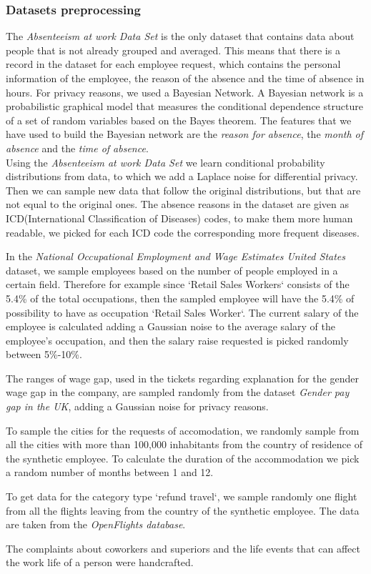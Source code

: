 \subsubsection{Datasets preprocessing}
The \textit{Absenteeism at work Data Set} is the only dataset that contains data about people that is not already grouped and averaged. This means that there is a record in the dataset for each employee request, which contains the personal information of the employee, the reason of the absence and the time of absence in hours. For privacy reasons, we used a Bayesian Network. A Bayesian network is a probabilistic graphical model that measures the conditional dependence structure of a set of random variables based on the Bayes theorem. The features that we have used to build the Bayesian network are the \textit{reason for absence}, the \textit{month of absence} and the \textit{time of absence}.
\\
Using the \textit{Absenteeism at work Data Set} we learn conditional probability distributions from data, to which we add a Laplace noise for differential privacy. Then we can sample new data that follow the original distributions, but that are not equal to the original ones. The absence reasons in the dataset are given as ICD(International Classification of Diseases) codes, to make them more human readable, we picked for each ICD code the corresponding more frequent diseases.

In the \textit{National Occupational Employment and Wage Estimates United States} dataset, we sample employees based on the number of people employed in a certain field. Therefore for example since `Retail Sales Workers` consists of the 5.4\% of the total occupations, then the sampled employee will have the 5.4\% of possibility to have as occupation `Retail Sales Worker`.
The current salary of the employee is calculated adding a Gaussian noise to the average salary of the employee's occupation, and then the salary raise requested is picked randomly between 5\%-10\%.

The ranges of wage gap, used in the tickets regarding explanation for the gender wage gap in the company, are sampled randomly from the dataset \textit{Gender pay gap in the UK}, adding a Gaussian noise for privacy reasons.

To sample the cities for the requests of accomodation, we randomly sample from all the cities with more than 100,000 inhabitants from the country of residence of the synthetic employee. To calculate the duration of the accommodation we pick a random number of months between 1 and 12.

To get data for the category type `refund travel`, we sample randomly one flight from all the flights leaving from the country of the synthetic employee. The data are taken from the \textit{OpenFlights database}.

The complaints about coworkers and superiors and the life events that can affect the work life of a person were handcrafted.
